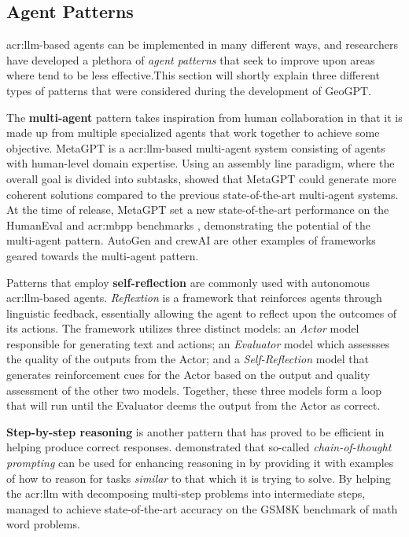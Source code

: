 \subsection{Agent Patterns}
\label{subsec:agent-patterns}

\acrshort{acr:llm}-based agents can be implemented in many different ways, and researchers have developed a plethora of \textit{agent patterns} that seek to improve upon areas where  tend to be less effective.This section will shortly explain three different types of patterns that were considered during the development of GeoGPT.

The \textbf{multi-agent} pattern takes inspiration from human collaboration in that it is made up from multiple specialized agents that work together to achieve some objective. MetaGPT \citep{hongMetaGPTMetaProgramming2023} is a \acrshort{acr:llm}-based multi-agent system consisting of agents with human-level domain expertise. Using an assembly line paradigm, where the overall goal is divided into subtasks, \citeauthor{hongMetaGPTMetaProgramming2023} showed that MetaGPT could generate more coherent solutions compared to the previous state-of-the-art multi-agent systems. At the time of release, MetaGPT set a new state-of-the-art performance on the HumanEval and \acrshort{acr:mbpp} benchmarks \citep[7]{hongMetaGPTMetaProgramming2023}, demonstrating the potential of the multi-agent pattern. AutoGen \citep{wuAutoGenEnablingNextGen2023a} and crewAI \citep{mouraJoaomdmouraCrewAI2024} are other examples of frameworks geared towards the multi-agent pattern.

Patterns that employ \textbf{self-reflection} are commonly used with autonomous \acrshort{acr:llm}-based agents. \textit{Reflextion} \citep{shinnReflexionLanguageAgents2023} is a framework that reinforces agents through linguistic feedback, essentially allowing the agent to reflect upon the outcomes of its actions. The framework utilizes three distinct models: an \textit{Actor} model responsible for generating text and actions; an \textit{Evaluator} model which assessses the quality of the outputs from the Actor; and a \textit{Self-Reflection} model that generates reinforcement cues for the Actor based on the output and quality assessment of the other two models. Together, these three models form a loop that will run until the Evaluator deems the output from the Actor as correct.

\textbf{Step-by-step reasoning} is another pattern that has proved to be efficient in helping  produce correct responses. \cite{weiChainofThoughtPromptingElicits2023a} demonstrated that so-called \textit{chain-of-thought prompting} can be used for enhancing reasoning in  by providing it with examples of how to reason for tasks \textit{similar} to that which it is trying to solve. By helping the \acrshort{acr:llm} with decomposing multi-step problems into intermediate steps, \citeauthor{weiChainofThoughtPromptingElicits2023a} managed to achieve state-of-the-art accuracy on the GSM8K benchmark of math word problems.


\glsresetall
